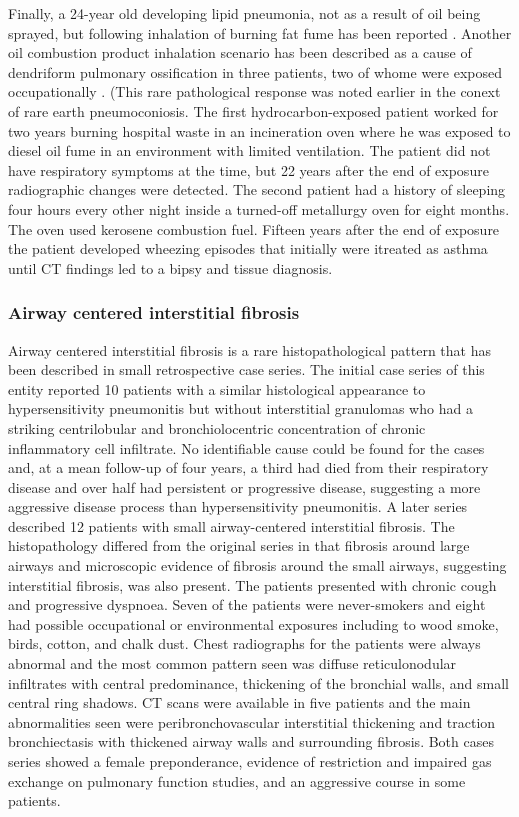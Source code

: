 \documentclass[a4paper,12pt]{article}
\begin{document}
Finally, a 24-year old developing lipid pneumonia, not as a result of oil being sprayed, but following inhalation of burning fat fume has been
reported \cite{Oldenburger1972}. Another oil combustion product inhalation scenario has been described as a cause of dendriform pulmonary ossification in three patients, two of whome were exposed occupationally \cite{Martinez2008}. (This rare pathological response was noted earlier in the conext of rare earth pneumoconiosis. The first hydrocarbon-exposed patient worked for two years burning hospital waste in an incineration oven where he was exposed to diesel oil fume in an environment with limited ventilation. The patient did not have respiratory symptoms at the time, but 22 years after the end of exposure radiographic changes were detected. The second patient had a history of sleeping four hours every other night inside a turned-off metallurgy oven for eight months. The oven used kerosene combustion fuel. Fifteen years after the end of exposure the patient developed wheezing episodes that initially were itreated as asthma until CT findings led to a bipsy and tissue diagnosis. 


\subsubsection{Airway centered interstitial fibrosis}
Airway centered interstitial fibrosis is a rare histopathological pattern that has been described in small retrospective case series. The initial case series \cite{Yousem2002} of this entity reported 10 patients with a similar histological appearance to hypersensitivity pneumonitis but without interstitial granulomas who had a striking centrilobular and bronchiolocentric concentration of chronic inflammatory cell infiltrate. No identifiable cause could be found for the cases and, at a mean follow-up of four years, a third had died from their respiratory disease and over half had persistent or progressive disease, suggesting a more aggressive disease process than hypersensitivity pneumonitis. A later series \cite{Churg2004} described 12 patients with small airway-centered interstitial fibrosis. The histopathology differed from the original series in that fibrosis around large airways and microscopic evidence of fibrosis around the small airways, suggesting interstitial fibrosis, was also present. The patients presented with chronic cough and progressive dyspnoea. Seven of the patients were never-smokers and eight had possible occupational or environmental exposures including to wood smoke, birds, cotton, and chalk dust. Chest radiographs for the patients were always abnormal and the most common pattern seen was diffuse reticulonodular infiltrates with central predominance, thickening of the bronchial walls, and small central ring shadows. CT scans were available in five patients and the main abnormalities seen were peribronchovascular interstitial thickening and traction bronchiectasis with thickened airway walls and surrounding fibrosis. Both cases series showed a female preponderance, evidence of restriction and impaired gas exchange on pulmonary function studies, and an aggressive course in some patients.
\end{document}
